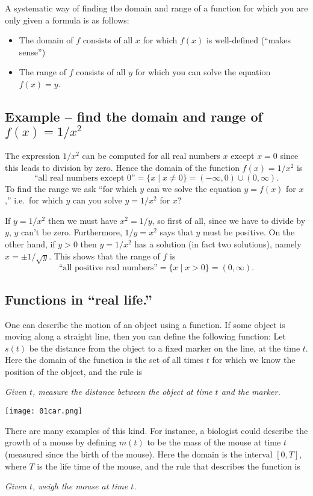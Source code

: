 A systematic way of finding the domain and range of a function for which you are
only given a formula is as follows:
\begin{itemize}
\item The domain of $f$ consists of all $x$ for which $f(x)$ is well-defined
  (``makes sense'')
\item The range of $f$ consists of all $y$ for which you can solve the
  equation $f(x) = y$.
\end{itemize}


\subsection{Example -- find the domain and range of $f(x) = 1/x^2$}
The expression $1/x^2$ can be computed for all real numbers $x$ except
$x=0$ since this leads to division by zero.  Hence the domain of the
function $f(x) = 1/x^2$ is
\[
\text{``all real numbers except $0$''}
=\bigl\{x \mid x\neq0\bigr\} = (-\infty, 0)\cup(0, \infty).
\]
To find the range we ask ``for which $y$ can we solve the equation
$y=f(x)$ for $x$,'' i.e.\ for which $y$ can you solve $y=1/{x^2}$ for
$x$?

If $y=1/x^2$ then we must have $x^2 = 1/y$, so first of all, since we
have to divide by $y$, $y$ can't be zero.  Furthermore, $1/y=x^2$ says
that $y$ must be positive.  On the other hand, if $y>0$ then $y=1/x^2$
has a solution (in fact two solutions), namely $x=\pm1/\surd y$.  This
shows that the range of $f$ is
\[
\text{``all positive real numbers''} = \{x \mid x>0\} = (0, \infty).
\]
\subsection{Functions in ``real life.''}
One can describe the motion of an object using a function.  If some
object is moving along a straight line, then you can define the
following function: Let $s(t)$ be the distance from the object to a
fixed marker on the line, at the time $t$.  Here the domain of the
function is the set of all times $t$ for which we know the position of
the object, and the rule is
\begin{center}
  \itshape Given $t$, measure the distance between the object at time $t$ and the
  marker.
\end{center}
\smallskip
\centerline{\texttt{[image: 01car.png]}}%
There are many examples of this kind.  For instance, a biologist could
describe the growth of a mouse by defining $m(t)$ to be the mass of the mouse
at time $t$ (measured since the birth of the mouse).  Here the domain is the
interval $[0, T]$, where $T$ is the life time of the mouse, and the rule
that describes the function is
\begin{center}
  \itshape Given $t$, weigh the mouse at time $t$.
\end{center}

